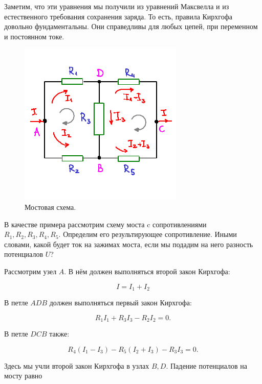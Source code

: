 \documentclass[11pt,a4paper]{article}
\numberwithin{equation}{section}
\begin{document}
Заметим, что эти уравнения мы получили из уравнений Максвелла и из
естественного требования сохранения заряда. То есть, правила Кирхгофа
довольно фундаментальны. Они справедливы для любых цепей, при
переменном и постоянном токе. 

\begin{figure}[h]
  \centering
  \includegraphics[scale=1.5]{bridge}
  \vspace{-1cm}
  \caption{Мостовая схема.}
  \label{fig:bridge}
\end{figure}

В качестве примера рассмотрим схему моста c сопротивлениями $R_1, R_2,
R_3, R_4, R_5$. Определим его результирующее сопротивление. Иными
словами, какой будет ток на зажимах моста, если мы подадим на него
разность потенциалов $U$?

Рассмотрим узел $A$. В нём должен выполняться второй закон
Кирхгофа:

\begin{equation}
  \label{eq:apply_kirchoff_0}
  I = I_1 + I_2
\end{equation}

В петле $ADB$ должен выполняться первый закон Кирхгофа:

\begin{equation}
  \label{eq:apply_kirchoff_1}
  R_1 I_1 + R_3 I_3 -R_2 I_2 = 0.
\end{equation}

В петле $DCB$ также:

\begin{equation}
  \label{eq:apply_kirchoff_2}
  R_4 (I_1 - I_3) - R_5 (I_2 + I_3) -R_3 I_3 =0.
\end{equation}

Здесь мы учли второй закон Кирхгофа в узлах $B,D$. Падение потенциалов на
мосту равно 
\end{document}
